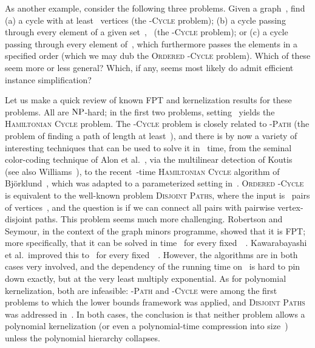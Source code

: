 \documentclass[a4paper,11pt]{article}
\newcommand{\cclass}[1]{\ensuremath{\mbox{\textup{#1}}}\xspace}
\newcommand{\NP}{\cclass{NP}}
\begin{document}
As another example, consider the following three problems. Given a graph~, find (a) a
cycle with at least~ vertices (the \textsc{-Cycle} problem); (b) a cycle passing
through every element of a given set~,~ (the \textsc{-Cycle} problem); or (c)
a cycle passing through every element of~, which furthermore passes the elements in a
specified order (which we may dub the \textsc{Ordered -Cycle} problem). Which of these
seem more or less general? Which, if any, seems most likely do admit efficient instance
simplification? 

Let us make a quick review of known FPT and kernelization results for these problems.
All are \NP-hard; in the first two problems, setting~ yields the \textsc{Hamiltonian
  Cycle} problem. The \textsc{-Cycle} problem is closely related to \textsc{-Path}
(the problem of finding a path of length at least~), and there is by now a variety of
interesting techniques that can be used to solve it in~ time, from the
seminal color-coding technique of Alon et al.~\cite{AlonYZ95}, via the multilinear
detection of Koutis~\cite{Koutis08} (see also Williams~\cite{Williams09}), to the
recent~-time \textsc{Hamiltonian Cycle} algorithm of Bj\"orklund~\cite{Bjorklund10b}, 
which was adapted to a parameterized setting in~\cite{BjorklundHKK10}.  \textsc{Ordered
  -Cycle} is equivalent to the well-known problem \textsc{Disjoint Paths}, where the
input is~ pairs of vertices~, and the question is if we can connect all
pairs with pairwise vertex-disjoint paths. This problem seems much more challenging. 
Robertson and Seymour, in the context of the graph minors programme, showed that it is
FPT; more specifically, that it can be solved in time~ for every
fixed~~\cite{RobertsonS95}. Kawarabayashi et al.~improved this to~ for every
fixed~~\cite{KawarabayashiKR12}. However, the algorithms are in both cases very
involved, and the dependency of the running time on~ is hard to pin down exactly, but
at the very least multiply exponential. As for polynomial kernelization, both are
infeasible: \textsc{-Path} and \textsc{-Cycle} were among the first problems to
which the lower bounds framework was applied, and \textsc{Disjoint Paths} was addressed
in~\cite{BodlaenderTY11}. In both cases, the conclusion is that neither problem allows a
polynomial kernelization (or even a polynomial-time compression into size~) unless
the polynomial hierarchy collapses. 
\end{document}
